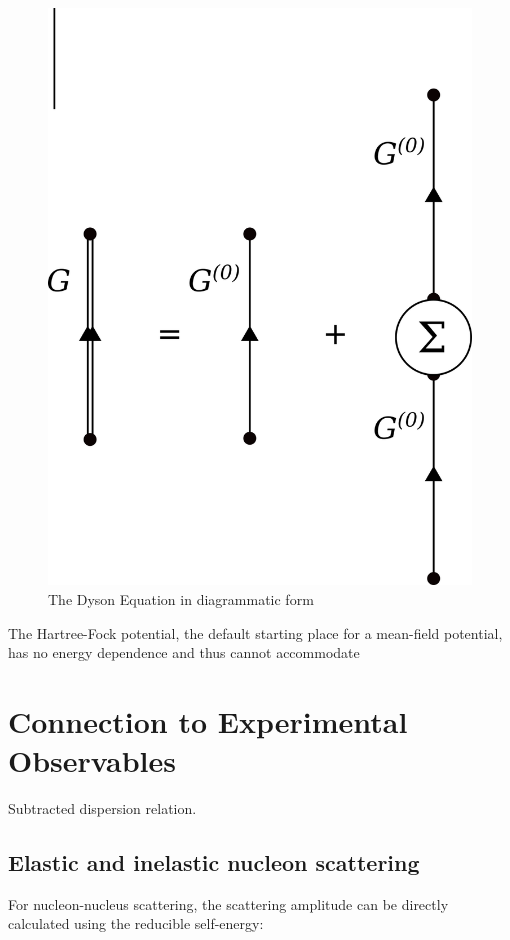 \begin{figure}
    \includegraphics[scale=0.35]{figures/DysonEquation.png}
    \caption{The Dyson Equation in diagrammatic form}
    \label{DysonEquation}
\end{figure}

The Hartree-Fock potential, the default starting place for a mean-field potential,
has no energy dependence and thus cannot accommodate 

\section{Connection to Experimental Observables}
Subtracted dispersion relation.

\subsection{Elastic and inelastic nucleon scattering}
For nucleon-nucleus scattering, the scattering amplitude can be directly calculated using the
reducible self-energy:

